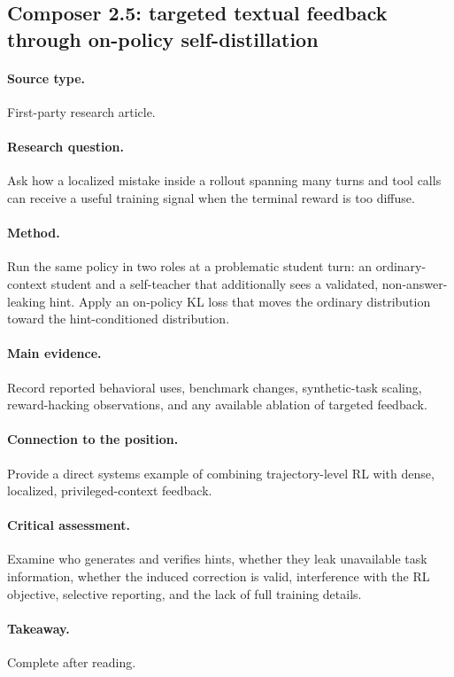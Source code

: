 \subsection{Composer 2.5: targeted textual feedback through on-policy self-distillation
\citep{cursor2026composer25,shenfeld2026selfdistillation}}
\paragraph{Source type.} First-party research article.
\paragraph{Research question.} Ask how a localized mistake inside a rollout spanning many
turns and tool calls can receive a useful training signal when the terminal reward is too diffuse.
\paragraph{Method.} Run the same policy in two roles at a problematic student turn: an
ordinary-context student and a self-teacher that additionally sees a validated,
non-answer-leaking hint. Apply an on-policy KL loss that moves the ordinary distribution
toward the hint-conditioned distribution.
\paragraph{Main evidence.} Record reported behavioral uses, benchmark changes, synthetic-task
scaling, reward-hacking observations, and any available ablation of targeted feedback.
\paragraph{Connection to the position.} Provide a direct systems example of combining
trajectory-level RL with dense, localized, privileged-context feedback.
\paragraph{Critical assessment.} Examine who generates and verifies hints, whether they
leak unavailable task information, whether the induced correction is valid, interference
with the RL objective, selective reporting, and the lack of full training details.
\paragraph{Takeaway.} Complete after reading.
